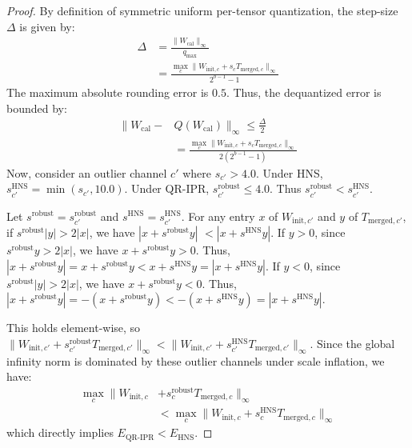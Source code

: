\documentclass{article}
\theoremstyle{plain}
\theoremstyle{definition}
\theoremstyle{remark}
\begin{document}
\begin{proof}
By definition of symmetric uniform per-tensor quantization, the step-size $\Delta$ is given by:
\begin{align}
    \Delta &= \frac{\|W_{\text{cal}}\|_{\infty}}{q_{\text{max}}} \nonumber \\
    &= \frac{\max_{c} \|W_{\text{init}, c} + s_c T_{\text{merged}, c}\|_{\infty}}{2^{b-1}-1}
\end{align}
The maximum absolute rounding error is $0.5$. Thus, the dequantized error is bounded by:
\begin{align}
    \|W_{\text{cal}} - &Q(W_{\text{cal}})\|_{\infty} \le \frac{\Delta}{2} \nonumber \\
    &= \frac{\max_{c} \|W_{\text{init}, c} + s_c T_{\text{merged}, c}\|_{\infty}}{2(2^{b-1}-1)}
\end{align}
Now, consider an outlier channel $c'$ where $s_{c'} > 4.0$. Under HNS, $s_{c'}^{\text{HNS}} = \min(s_{c'}, 10.0)$. Under QR-IPR, $s_{c'}^{\text{robust}} \le 4.0$. Thus $s_{c'}^{\text{robust}} < s_{c'}^{\text{HNS}}$.

Let $s^{\text{robust}} = s_{c'}^{\text{robust}}$ and $s^{\text{HNS}} = s_{c'}^{\text{HNS}}$. For any entry $x$ of $W_{\text{init}, c'}$ and $y$ of $T_{\text{merged}, c'}$, if $s^{\text{robust}} |y| > 2|x|$, we have $|x + s^{\text{robust}} y|$ $< |x + s^{\text{HNS}} y|$.
If $y > 0$, since $s^{\text{robust}} y > 2|x|$, we have $x + s^{\text{robust}} y > 0$. Thus, $|x + s^{\text{robust}} y| = x + s^{\text{robust}} y < x + s^{\text{HNS}} y = |x + s^{\text{HNS}} y|$.
If $y < 0$, since $s^{\text{robust}} |y| > 2|x|$, we have $x + s^{\text{robust}} y < 0$. Thus, $|x + s^{\text{robust}} y| = -(x + s^{\text{robust}} y) < -(x + s^{\text{HNS}} y) = |x + s^{\text{HNS}} y|$.

This holds element-wise, so $\|W_{\text{init}, c'} + s_{c'}^{\text{robust}} T_{\text{merged}, c'}\|_{\infty} < \|W_{\text{init}, c'} + s_{c'}^{\text{HNS}} T_{\text{merged}, c'}\|_{\infty}$.
Since the global infinity norm is dominated by these outlier channels under scale inflation, we have:
\begin{align}
    \max_{c} \|W_{\text{init}, c} &+ s_c^{\text{robust}} T_{\text{merged}, c}\|_{\infty} \nonumber \\
    &< \max_{c} \|W_{\text{init}, c} + s_c^{\text{HNS}} T_{\text{merged}, c}\|_{\infty}
\end{align}
which directly implies $E_{\text{QR-IPR}} < E_{\text{HNS}}$.
\end{proof}
\end{document}

